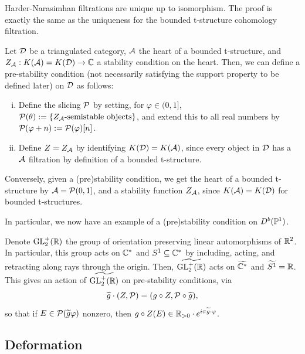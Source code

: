 \documentclass[12pt]{article}
\begin{document}
\begin{rmk}
    Harder-Narasimhan filtrations are unique up to isomorphism. The proof is exactly the same as the uniqueness for the bounded t-structure cohomology filtration.
\end{rmk}

\begin{eg}
    Let $\cD$ be a triangulated category, $\cA$ the heart of a bounded t-structure, and $Z_\cA: K(\cA)=K(\cD) \to \C$ a stability condition on the heart. Then, we can define a pre-stability condition (not necessarily satisfying the support property to be defined later) on $\cD$ as follows:
    \begin{enumerate}[(i)]
        \item Define the slicing $\cP$ by setting, for $\varphi \in (0,1]$, $\cP(\theta) \defeq \{\text{$Z_\cA$-semistable objects}\}$, and extend this to all real numbers by $\cP(\varphi+n) \defeq \cP(\varphi)[n]$.
        \item Define $Z=Z_\cA$ by identifying $K(\cD)=K(\cA)$, since every object in $\cD$ has a $\cA$ filtration by definition of a bounded t-structure.
    \end{enumerate}

    Conversely, given a (pre)stability condition, we get the heart of a bounded t-structure by $\cA=\cP(0,1]$, and a stability function $Z_{\cA}$, since $K(\cA) = K(\cD)$ for bounded t-structures.
    
    In particular, we now have an example of a (pre)stability condition on $D^b(\P^1)$.
\end{eg}

\begin{rmk}
    Denote $\GL^+_2(\R)$ the group of orientation preserving linear automorphisms of $\R^2$. In particular, this group acts on $\C^*$ and $S^1\subseteq \C^*$ by including, acting, and retracting along rays through the origin. Then, $\tilde{\GL^+_2(\R)}$ acts on $\tilde{\C^*}$ and $\tilde{S^1}=\R$. This gives an action of $\tilde{\GL^+_2(\R)}$ on pre-stability conditions, via
    \[\tilde{g}\cdot (Z,\cP) = (g\circ Z, \cP\circ \tilde{g}),\]
    so that if $E\in \cP(\tilde{g} \varphi)$ nonzero, then $g\circ Z(E) \in \R_{>0}\cdot e^{i\pi \tilde{g} \cdot \varphi}$.
\end{rmk}

\subsection{Deformation}
\end{document}
